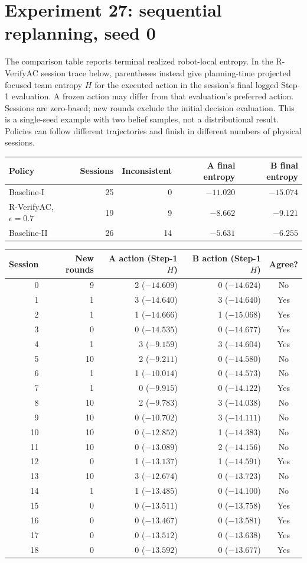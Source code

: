 \documentclass[10pt,a4paper]{article}
\begin{document}
\section*{Experiment 27: sequential replanning, seed 0}
The comparison table reports terminal realized robot-local entropy. In the R-VerifyAC session trace below, parentheses instead give planning-time projected focused team entropy $H$ for the executed action in the session's final logged Step-1 evaluation. A frozen action may differ from that evaluation's preferred action. Sessions are zero-based; new rounds exclude the initial decision evaluation.
This is a single-seed example with two belief samples, not a distributional result. Policies can follow different trajectories and finish in different numbers of physical sessions.
\begin{center}\begin{tabular}{lrrrr}\toprule
Policy & Sessions & Inconsistent & A final entropy & B final entropy\\\midrule
Baseline-I & 25 & 0 & $-11.020$ & $-15.074$\\
R-VerifyAC, $\epsilon=0.7$ & 19 & 9 & $-8.662$ & $-9.121$\\
Baseline-II & 26 & 14 & $-5.631$ & $-6.255$\\\bottomrule
\end{tabular}\end{center}
 \begin{center}\small\begin{tabular}{rrrrc}\toprule
Session & New rounds & A action (Step-1 $H$) & B action (Step-1 $H$) & Agree?\\\midrule
0&9&2 ($-14.609$)&0 ($-14.624$)&No\\
1&1&3 ($-14.640$)&3 ($-14.640$)&Yes\\
2&1&1 ($-14.666$)&1 ($-15.068$)&Yes\\
3&0&0 ($-14.535$)&0 ($-14.677$)&Yes\\
4&1&3 ($-9.159$)&3 ($-14.604$)&Yes\\
5&10&2 ($-9.211$)&0 ($-14.580$)&No\\
6&1&1 ($-10.014$)&0 ($-14.573$)&No\\
7&1&0 ($-9.915$)&0 ($-14.122$)&Yes\\
8&10&2 ($-9.783$)&3 ($-14.038$)&No\\
9&10&0 ($-10.702$)&3 ($-14.111$)&No\\
10&10&0 ($-12.852$)&1 ($-14.383$)&No\\
11&10&0 ($-13.089$)&2 ($-14.156$)&No\\
12&0&1 ($-13.137$)&1 ($-14.591$)&Yes\\
13&10&3 ($-12.674$)&0 ($-13.723$)&No\\
14&1&1 ($-13.485$)&0 ($-14.100$)&No\\
15&0&0 ($-13.511$)&0 ($-13.758$)&Yes\\
16&0&0 ($-13.467$)&0 ($-13.581$)&Yes\\
17&0&0 ($-13.512$)&0 ($-13.638$)&Yes\\
18&0&0 ($-13.592$)&0 ($-13.677$)&Yes\\\bottomrule
\end{tabular}\end{center}
\end{document}
